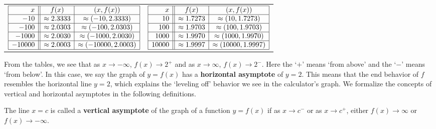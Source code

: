 \begin{center}
\begin{tabular}{cc}

$\begin{array}{|r||c|c|}  \hline

  x & f(x) & (x,f(x)) \\ \hline
 -10 & \approx 2.3333 & \approx (-10,  2.3333) \\  \hline
 -100 & \approx 2.0303 & \approx (-100, 2.0303) \\  \hline 
 -1000 &  \approx 2.0030 & \approx ( -1000,  2.0030) \\  \hline 
  -10000 &  \approx 2.0003 & \approx ( -10000, 2.0003) \\  \hline 
  \end{array} $ \hspace{.75in} & 

$\begin{array}{|r||c|c|}  \hline

  x & f(x) & (x,f(x)) \\ \hline
 10 & \approx 1.7273 & \approx (10,  1.7273) \\  \hline
 100 & \approx 1.9703 & \approx (100, 1.9703) \\  \hline 
 1000 &  \approx 1.9970 & \approx ( 1000,  1.9970) \\  \hline 
  10000 &  \approx 1.9997 & \approx ( 10000, 1.9997) \\  \hline 
  \end{array} $  \\

\end{tabular}

\end{center}

From the tables, we see that as $x \rightarrow -\infty$, $f(x) \rightarrow 2^{+}$ and as $x \rightarrow \infty$, $f(x) \rightarrow 2^{-}$.  Here the `$+$' means `from above' and the `$-$' means `from below'.  In this case, we say the graph of $y=f(x)$ has a \textbf{horizontal asymptote} of $y=2$.  This means that the end behavior of $f$ resembles the horizontal line $y=2$, which explains the `leveling off' behavior we see in the calculator's graph.  We formalize the concepts of vertical and horizontal asymptotes in the following definitions.

\medskip

\colorbox{ResultColor}{\bbm

\begin{defn} \label{va} The line $x=c$ is called a \textbf{vertical asymptote} of the graph of a function $y=f(x)$ if as $x \rightarrow c^{-}$ or as $x \rightarrow c^{+}$, either $f(x) \rightarrow \infty$ or $f(x) \rightarrow -\infty$.

\end{defn}
\ebm}

